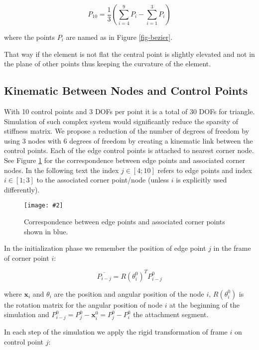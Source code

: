 \documentclass{egpubl}
\newcommand{\Figure}[3]{%
\begin{figure}[htb]
  \centering
  \texttt{[image: \#2]}
  \caption{\label{fig-#2}#3}
\end{figure}}
\newcommand{\CD}[1]{{\color{magenta}{\textbf{C: #1}}}}
\begin{document}
\begin{equation}\label{eq-central}
    P_{10} = \frac{1}{3}(\sum_{i=4}^9 P_i - \sum_{i=1}^3 P_i)
\end{equation}

\noindent
where the points $P_i$ are named as in Figure \ref{fig-bezier}.

That way if the element is not flat the central point is slightly elevated
and not in the plane of other points thus keeping the curvature of the
element.


\subsection{Kinematic Between Nodes and Control Points } %

With 10 control points and 3 DOFs per point it is a total of 30 DOFs for triangle.
Simulation of such complex system would significantly reduce the sparsity of stiffness matrix.
We propose a reduction of the number of degrees of freedom by using 3 nodes with 6 degrees of freedom
by creating a kinematic link between the control points.
Each of the edge control points is attached to nearest corner node. See Figure
\ref{fig-segments} for the correspondence between edge points and
associated corner nodes. 
In the following text the index $j \in [4;10]$ refers to edge points and index $i \in [1;3]$ to the associated corner point/node (unless $i$ is explicitly used differently).

\Figure{0.8\linewidth}{segments}
{Correspondence between edge points and associated corner points shown in
blue. \CD{Not clear !!}}

In the initialization phase we remember the position of edge point $j$ in the frame of corner point $i$:

\begin{equation}
    \overline{P_{i-j}} = R(\theta_i^0)^T P_{i-j}^0
\end{equation}

\noindent
where
$\mathbf{x}_i$ and $\theta_i$ are the position and angular position of the node $i$,
$R(\theta_i^0)$ is the rotation matrix for the angular position of node $i$ at the beginning of the simulation and
$P_{i-j}^0 = P_j^0 - \mathbf{x}_i^0 = P_j^0 - P_i^0$ the attachment segment.

In each step of the simulation we
apply the rigid transformation of frame $i$ on control point $j$:
\end{document}
